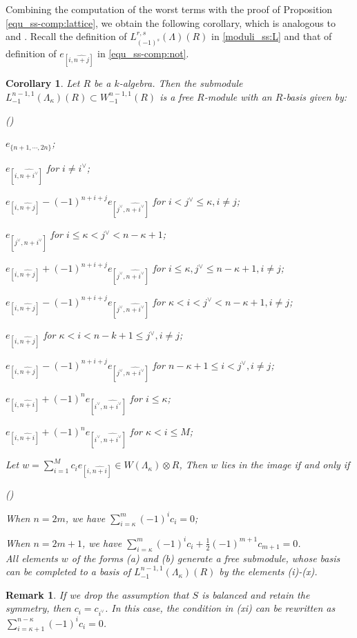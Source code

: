 \documentclass[pdflatex,sn-mathphys-num]{sn-jnl}%
\theoremstyle{thmstyleone}%
\newtheorem{corollary}[subsubsection]{Corollary}%
\theoremstyle{thmstyletwo}%
\newtheorem{remark}[subsubsection]{Remark}%
\numberwithin{equation}{subsection}
\theoremstyle{thmstylethree}%
\newcommand{\wh}{\widehat}
\newenvironment{altenumerate}
	{\begin{list}
			{(\theenumi) }
			{\usecounter{enumi}
				\setlength{\labelwidth}{0pt}
				\setlength{\labelsep}{0pt}
				\setlength{\leftmargin}{0pt}
				\setlength{\itemsep}{\the\smallskipamount}
				\renewcommand{\theenumi}{\roman{enumi}}
		}}
		{\end{list}}
\newenvironment{altenumerate2}
	{\begin{list}
			{\textup{(\theenumii)} }
			{\usecounter{enumii}
				\setlength{\labelwidth}{0pt}
				\setlength{\labelsep}{0pt}
				\setlength{\leftmargin}{2em}
				\setlength{\itemsep}{\the\smallskipamount}
				\renewcommand{\theenumii}{\alph{enumii}}
		}}
		{\end{list}}
\begin{document}
		
		
Combining the computation of the worst terms with the proof of Proposition \ref{equ_ss-comp:lattice}, we obtain the following corollary, which is analogous to \cite[Corollary 4.14]{Smithling2015} and \cite[Proposition 2.]{Yu2019}. 
Recall the definition of $L^{r,s}_{(-1)^s}(\Lambda)(R)$ in \eqref{moduli_ss:L} and that of definition of $e_{[i,\wh{n+j}]}$ in \eqref{equ_ss-comp:not}.
		
\begin{corollary}\label{equ_ss-comp:basis}
Let $R$ be a $k$-algebra. Then the submodule $L^{n-1,1}_{-1}(\Lambda_\kappa)(R)\subset W_{-1}^{n-1,1}(R)$ is a free $R$-module with an $R$-basis given by:
\begin{altenumerate}
\item $e_{\{n+1,\cdots,2n\}}$;
\item $e_{[i,\wh{n+i^\vee}]}$ for $i\neq i^\vee$;
\item $e_{[i,\wh{n+j}]}-(-1)^{n+i+j}e_{[j^\vee,\wh{n+i^\vee}]}$ for $i<j^\vee\leq \kappa,i\neq j$;
\item $e_{[j^\vee,\wh{n+i^\vee}]}$ for $i\leq \kappa<j^\vee<n-\kappa+1$;
\item $e_{[i,\wh{n+j}]}+(-1)^{n+i+j}e_{[j^\vee,\wh{n+i^\vee}]}$ for $i\leq \kappa,j^\vee\leq n-\kappa+1,i\neq j$;
\item $e_{[i,\wh{n+j}]}-(-1)^{n+i+j}e_{[j^\vee,\wh{n+i^\vee}]}$ for $\kappa<i<j^\vee<n-\kappa+1,i\neq j$;
\item  $e_{[i,\wh{n+j}]}$ for $\kappa<i<n-k+1\leq j^\vee,i\neq j$;
\item $e_{[i,\wh{n+j}]}-(-1)^{n+i+j}e_{[j^\vee,\wh{n+i^\vee}]}$ for $n-\kappa+1\leq i<j^\vee,i\neq j$;
\item  $e_{[i,\wh{n+i}]}+(-1)^ne_{[i^\vee,\wh{n+i^\vee}]}$ for $i\leq \kappa$;
\item  $e_{[i,\wh{n+i}]}+(-1)^ne_{[i^\vee,\wh{n+i^\vee}]}$ for $\kappa< i\leq M$;
\item Let $w=\sum_{i=1}^M c_i e_{[i,\wh{n+i}]}\in W(\Lambda_\kappa)\otimes R$, Then $w$ lies in the image if and only if 
    \begin{altenumerate2}
	   \item When $n=2m$, we have $\sum_{i=\kappa}^m (-1)^ic_i=0$;
	   \item When $n=2m+1$, we have $\sum_{i=\kappa}^m (-1)^ic_i+\frac{1}{2}(-1)^{m+1}c_{m+1}=0$.\\
	All elements $w$ of the forms (a) and (b) generate a free submodule, whose basis can be completed to a basis of $L_{-1}^{n-1,1}(\Lambda_\kappa)(R)$ by the elements (i)-(x).
    \end{altenumerate2}
\end{altenumerate}
\end{corollary}
\begin{remark}
	If we drop the assumption that $S$ is balanced and retain the symmetry, then $c_i=c_{i^\vee}$. In this case, the condition in (xi) can be rewritten as $\sum_{i=\kappa+1}^{n-\kappa}(-1)^ic_i=0$.	
\end{remark}
	
\end{document}
